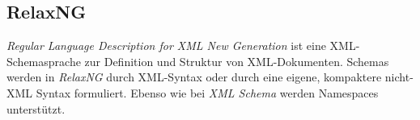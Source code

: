 \subsection{RelaxNG}
\label{sec:relaxng}

\emph{Regular Language Description for XML New Generation} ist eine XML-Schemasprache zur Definition und Struktur von XML-Dokumenten. Schemas werden in \emph{RelaxNG} durch XML-Syntax oder durch eine eigene, kompaktere nicht-XML Syntax formuliert. Ebenso wie bei \emph{XML Schema} werden Namespaces unterstützt.